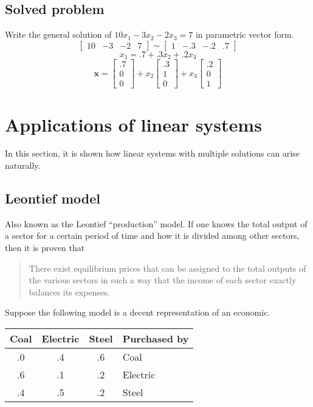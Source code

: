 \documentclass[12pt, oneside]{book}
\begin{document}
\subsection*{Solved problem}
Write the general solution of \( 10 x_1 - 3 x_2 - 2 x_3 = 7\)
in parametric vector form.
\[ \left[ \begin{array}{cccc}
10 & -3 & -2 & 7 \end{array} \right] \sim
\left[ \begin{array}{cccc}
1 & -.3 & -.2 & .7 \end{array} \right] \]
    \[ x_1 = .7 + .3x_2 + .2x_3 \]
  \[ \mathbf{x} = \left[ \begin{array}{c} .7 \\ 0 \\ 0 \end{array} \right]
+ x_2 \left[ \begin{array}{c} .3 \\ 1 \\ 0 \end{array} \right]
+ x_3 \left[ \begin{array}{c} .2 \\ 0 \\ 1 \end{array} \right] \]

\section{Applications of linear systems}
In this section, it is shown how linear systems with multiple solutions can
arise naturally.
\subsection{Leontief model}
Also known as the Leontief ``production'' model.
If one knows the total output of a sector for a certain period of time and how
it is
divided among other sectors, then it is proven that
\begin{quote}
There exist equilibrium prices that can be assigned to the total outputs of the
various sectors in such a way that the income of each sector exactly balances
its
expenses.
\end{quote}

Suppose the following model is a decent representation of an economic.
\begin{center}
\begin{tabular}{| c c c | l |}
\hline
Coal & Electric & Steel & Purchased by \\
\hline
.0 & .4 & .6 & Coal \\
.6 & .1 & .2 & Electric \\
.4 & .5 & .2 & Steel \\
\hline
\end{tabular}
\end{center}
\end{document}
